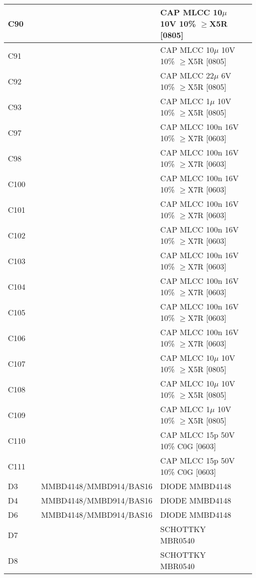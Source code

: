 \begin{longtable}{|l|l|l|l|l|}
\hline
C90 &  &  & CAP MLCC 10\ensuremath{\mu} 10V 10\% \ensuremath{\geq}X5R [0805] &  \\
\hline
C91 &  &  & CAP MLCC 10\ensuremath{\mu} 10V 10\% \ensuremath{\geq}X5R [0805] &  \\
\hline
C92 &  &  & CAP MLCC 22\ensuremath{\mu} 6V 10\% \ensuremath{\geq}X5R [0805] &  \\
\hline
C93 &  &  & CAP MLCC 1\ensuremath{\mu} 10V 10\% \ensuremath{\geq}X5R [0805] &  \\
\hline
C97 &  &  & CAP MLCC 100n 16V 10\% \ensuremath{\geq}X7R [0603] &  \\
\hline
C98 &  &  & CAP MLCC 100n 16V 10\% \ensuremath{\geq}X7R [0603] &  \\
\hline
C100 &  &  & CAP MLCC 100n 16V 10\% \ensuremath{\geq}X7R [0603] &  \\
\hline
C101 &  &  & CAP MLCC 100n 16V 10\% \ensuremath{\geq}X7R [0603] &  \\
\hline
C102 &  &  & CAP MLCC 100n 16V 10\% \ensuremath{\geq}X7R [0603] &  \\
\hline
C103 &  &  & CAP MLCC 100n 16V 10\% \ensuremath{\geq}X7R [0603] &  \\
\hline
C104 &  &  & CAP MLCC 100n 16V 10\% \ensuremath{\geq}X7R [0603] &  \\
\hline
C105 &  &  & CAP MLCC 100n 16V 10\% \ensuremath{\geq}X7R [0603] &  \\
\hline
C106 &  &  & CAP MLCC 100n 16V 10\% \ensuremath{\geq}X7R [0603] &  \\
\hline
C107 &  &  & CAP MLCC 10\ensuremath{\mu} 10V 10\% \ensuremath{\geq}X5R [0805] &  \\
\hline
C108 &  &  & CAP MLCC 10\ensuremath{\mu} 10V 10\% \ensuremath{\geq}X5R [0805] &  \\
\hline
C109 &  &  & CAP MLCC 1\ensuremath{\mu} 10V 10\% \ensuremath{\geq}X5R [0805] &  \\
\hline
C110 &  &  & CAP MLCC 15p 50V 10\% C0G [0603] &  \\
\hline
C111 &  &  & CAP MLCC 15p 50V 10\% C0G [0603] &  \\
\hline
D3 &  & MMBD4148/MMBD914/BAS16 & DIODE MMBD4148 &  \\
\hline
D4 &  & MMBD4148/MMBD914/BAS16 & DIODE MMBD4148 &  \\
\hline
D6 &  & MMBD4148/MMBD914/BAS16 & DIODE MMBD4148 &  \\
\hline
D7 &  &  & SCHOTTKY MBR0540 &  \\
\hline
D8 &  &  & SCHOTTKY MBR0540 &  \\

\end{longtable}
